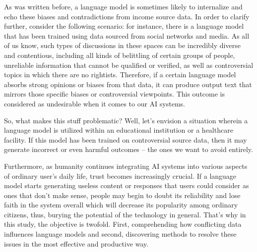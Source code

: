 As was written before, a language model is sometimes likely to internalize and echo these biases and contradictions from income source data. In order to clarify further, consider the following scenario: for instance, there is a language model that has been trained using data sourced from social networks and media. As all of us know, such types of discussions in these spaces can be incredibly diverse and contentious, including all kinds of belittling of certain groups of people, unreliable information that cannot be qualified or verified, as well as controversial topics in which there are no rightists. Therefore, if a certain language model absorbs strong opinions or biases from that data, it can produce output text that mirrors those specific biases or controversial viewpoints. This outcome is considered as undesirable when it comes to our AI systems. 
  
So, what makes this stuff problematic? Well, let's envision a situation wherein a language model is utilized within an educational institution or a healthcare facility. If this model has been trained on controversial source data, then it may generate incorrect or even harmful outcomes – the ones we want to avoid entirely. 

Furthermore, as humanity continues integrating AI systems into various aspects of ordinary user’s daily life, trust becomes increasingly crucial. If a language model starts generating useless content or responses that users could consider as ones that don't make sense,  people may begin to doubt its reliability and lose faith in the system overall which will decrease its popularity among ordinary citizens, thus, burying the potential of the technology in general. That's why in this study, the objective is twofold. First, comprehending how conflicting data influences language models and second, discovering methods to resolve these issues in the most effective and productive way.


